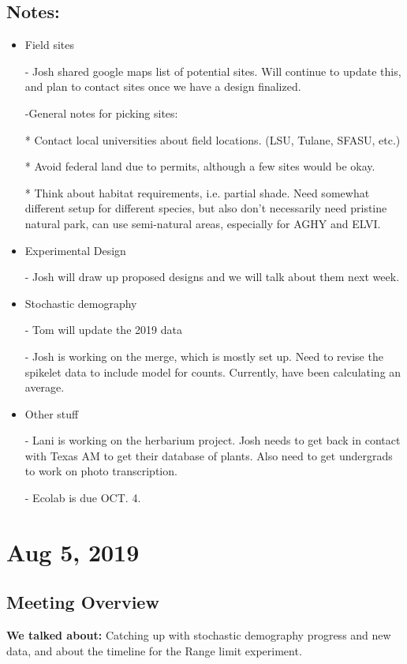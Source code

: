 \documentclass{article}
\begin{document}
 \subsection*{Notes:}
 \begin{itemize}
 \item{Field sites}
 
 - Josh shared google maps list of potential sites. Will continue to update this, and plan to contact sites once we have a design finalized.
 
 -General notes for picking sites:
 
 * Contact local universities about field locations. (LSU, Tulane, SFASU, etc.)
 
 * Avoid federal land due to permits, although a few sites would be okay.
 
 * Think about habitat requirements, i.e. partial shade. Need somewhat different setup for different species, but also don't necessarily need pristine natural park, can use semi-natural areas, especially for AGHY and ELVI. 
 
 \item{Experimental Design}
 
 - Josh will draw up proposed designs and we will talk about them next week. 
 
 
 \item{Stochastic demography}
 
 - Tom will update the 2019 data
 
 - Josh is working on the merge, which is mostly set up. Need to revise the spikelet data to include model for counts. Currently, have been calculating an average. 
 
 \item{Other stuff}
 
 - Lani is working on the herbarium project. Josh needs to get back in contact with Texas AM to get their database of plants. Also need to get undergrads to work on photo transcription.
 
 - Ecolab is due OCT. 4.
 
 \end{itemize}
 
\section*{Aug 5, 2019}
\subsection*{Meeting Overview}
\textbf{We talked about:}
Catching up with stochastic demography progress and new data, and about the timeline for the Range limit experiment.
\end{document}
